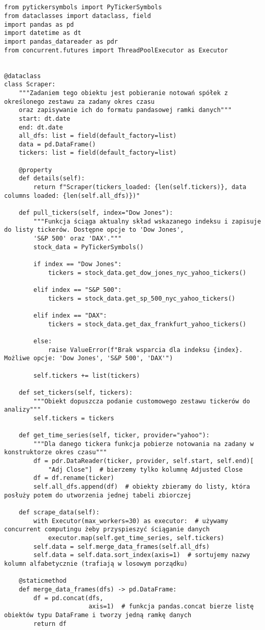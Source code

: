 \documentclass[12pt,a4paper,twoside,openany]{book}
\begin{document}
\begin{verbatim}
    

from pytickersymbols import PyTickerSymbols
from dataclasses import dataclass, field
import pandas as pd
import datetime as dt
import pandas_datareader as pdr
from concurrent.futures import ThreadPoolExecutor as Executor


@dataclass
class Scraper:
    """Zadaniem tego obiektu jest pobieranie notowań spółek z określonego zestawu za zadany okres czasu
    oraz zapisywanie ich do formatu pandasowej ramki danych"""
    start: dt.date
    end: dt.date
    all_dfs: list = field(default_factory=list)
    data = pd.DataFrame()
    tickers: list = field(default_factory=list)

    @property
    def details(self):
        return f"Scraper(tickers_loaded: {len(self.tickers)}, data columns loaded: {len(self.all_dfs)})"

    def pull_tickers(self, index="Dow Jones"):
        """Funkcja ściąga aktualny skład wskazanego indeksu i zapisuje do listy tickerów. Dostępne opcje to 'Dow Jones',
        'S&P 500' oraz 'DAX'."""
        stock_data = PyTickerSymbols()

        if index == "Dow Jones":
            tickers = stock_data.get_dow_jones_nyc_yahoo_tickers()

        elif index == "S&P 500":
            tickers = stock_data.get_sp_500_nyc_yahoo_tickers()

        elif index == "DAX":
            tickers = stock_data.get_dax_frankfurt_yahoo_tickers()

        else:
            raise ValueError(f"Brak wsparcia dla indeksu {index}. Możliwe opcje: 'Dow Jones', 'S&P 500', 'DAX'")

        self.tickers += list(tickers)

    def set_tickers(self, tickers):
        """Obiekt dopuszcza podanie customowego zestawu tickerów do analizy"""
        self.tickers = tickers

    def get_time_series(self, ticker, provider="yahoo"):
        """Dla danego tickera funkcja pobierze notowania na zadany w konstruktorze okres czasu"""
        df = pdr.DataReader(ticker, provider, self.start, self.end)[
            "Adj Close"]  # bierzemy tylko kolumnę Adjusted Close
        df = df.rename(ticker)
        self.all_dfs.append(df)  # obiekty zbieramy do listy, która posłuży potem do utworzenia jednej tabeli zbiorczej

    def scrape_data(self):
        with Executor(max_workers=30) as executor:  # używamy concurrent computingu żeby przyspieszyć ściąganie danych
            executor.map(self.get_time_series, self.tickers)
        self.data = self.merge_data_frames(self.all_dfs)
        self.data = self.data.sort_index(axis=1)  # sortujemy nazwy kolumn alfabetycznie (trafiają w losowym porządku)

    @staticmethod
    def merge_data_frames(dfs) -> pd.DataFrame:
        df = pd.concat(dfs,
                       axis=1)  # funkcja pandas.concat bierze listę obiektów typu DataFrame i tworzy jedną ramkę danych
        return df
\end{verbatim}
\end{document}
